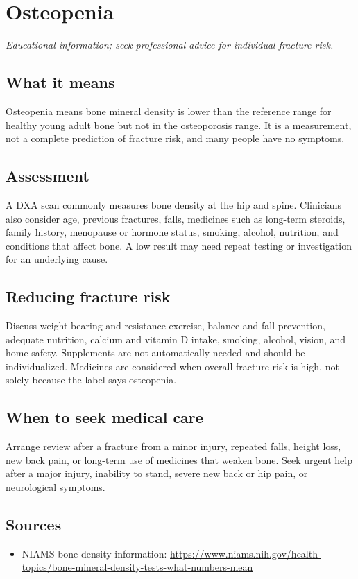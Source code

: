 \chapter{Osteopenia}

\medskip
\noindent\textit{Educational information; seek professional advice for individual fracture risk.}

\section*{What it means}
Osteopenia means bone mineral density is lower than the reference range for healthy young adult bone but not in the osteoporosis range. It is a measurement, not a complete prediction of fracture risk, and many people have no symptoms.

\section*{Assessment}
A DXA scan commonly measures bone density at the hip and spine. Clinicians also consider age, previous fractures, falls, medicines such as long-term steroids, family history, menopause or hormone status, smoking, alcohol, nutrition, and conditions that affect bone. A low result may need repeat testing or investigation for an underlying cause.

\section*{Reducing fracture risk}
Discuss weight-bearing and resistance exercise, balance and fall prevention, adequate nutrition, calcium and vitamin D intake, smoking, alcohol, vision, and home safety. Supplements are not automatically needed and should be individualized. Medicines are considered when overall fracture risk is high, not solely because the label says osteopenia.

\section*{When to seek medical care}
Arrange review after a fracture from a minor injury, repeated falls, height loss, new back pain, or long-term use of medicines that weaken bone. Seek urgent help after a major injury, inability to stand, severe new back or hip pain, or neurological symptoms.

\section*{Sources}
\begin{itemize}
\item NIAMS bone-density information: \url{https://www.niams.nih.gov/health-topics/bone-mineral-density-tests-what-numbers-mean}
\end{itemize}

